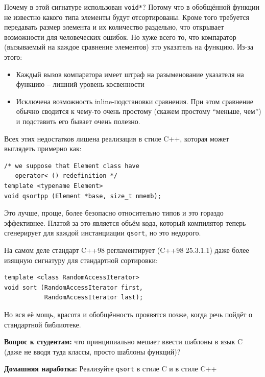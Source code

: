 \documentclass[a4paper,12pt,oneside]{article}
\newif\ifanswers
\begin{document}
Почему в этой сигнатуре использован \lstinline!void*!? Потому что в обобщённой функции не известно какого типа элементы будут отсортированы. Кроме того требуется передавать размер элемента и их количество раздельно, что открывает возможности для человеческих ошибок. Но хуже всего то, что компаратор (вызываемый на каждое сравнение элементов) это указатель на функцию. Из-за этого:

\begin{itemize}
\item Каждый вызов компаратора имеет штраф на разыменование указателя на функцию -- лишний уровень косвенности
\item Исключена возможность inline-подстановки сравнения. При этом сравнение обычно сводится к чему-то очень простому (скажем простому ``меньше, чем'') и подставить его бывает очень полезно.
\end{itemize}

Всех этих недостатков лишена реализация в стиле C++, которая может выглядеть примерно как:

\begin{lstlisting}
/* we suppose that Element class have 
   operator< () redefinition */
template <typename Element>
void qsortpp (Element *base, size_t nmemb);
\end{lstlisting}

Это лучше, проще, более безопасно относительно типов и это гораздо эффективнее. Платой за это является объём кода, который компилятор теперь сгенерирует для каждой инстанциации \lstinline!qsort!, но это недорого.

На самом деле стандарт C++98 регламентирует (C++98 25.3.1.1) даже более изящную сигнатуру для стандартной сортировки:

\begin{lstlisting}
template <class RandomAccessIterator>
void sort (RandomAccessIterator first, 
           RandomAccessIterator last);
\end{lstlisting}

Но вся её мощь, красота и обобщённость проявятся позже, когда речь пойдёт о стандартной библиотеке.

\textbf{Вопрос к студентам:} что принципиально мешает ввести шаблоны в язык C (даже не вводя туда классы, просто шаблоны функций)?

\ifanswers
В этом случае не обойтись без манглирования имён, чего в случае C никто не хочет
\fi

\textbf{Домашняя наработка:} Реализуйте \lstinline!qsort! в стиле C и в стиле C++
\end{document}
